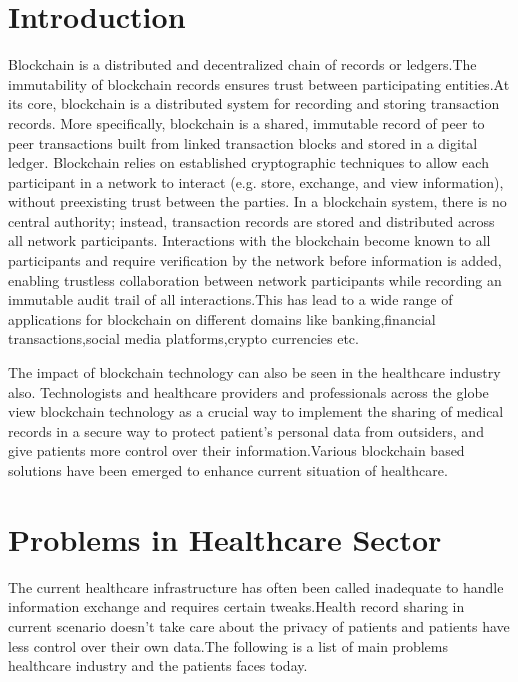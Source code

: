 \documentclass[12pt]{report}
\begin{document}
\tableofcontents
{}

\listoffigures


\chapter{Introduction}

Blockchain is a distributed and decentralized chain of records or ledgers.The immutability of blockchain records ensures trust between participating entities.At its core, blockchain is a distributed
system for recording and storing transaction
records. More specifically, blockchain is a
shared, immutable record of peer to peer
transactions built from linked transaction
blocks and stored in a digital ledger.
Blockchain relies on established
cryptographic techniques to allow each
participant in a network to interact (e.g.
store, exchange, and view information),
without preexisting trust between the
parties. In a blockchain system, there is no
central authority; instead, transaction
records are stored and distributed across all
network participants. Interactions with the
blockchain become known to all participants
and require verification by the network
before information is added, enabling
trustless collaboration between network
participants while recording an immutable
audit trail of all interactions.This has lead to a wide range of applications for blockchain on different domains like banking,financial transactions,social media platforms,crypto currencies etc.
\newline
\par The impact of blockchain technology can also be seen in the healthcare industry also. Technologists and healthcare providers and professionals across the globe view blockchain technology as a crucial way to implement the sharing of medical records in a secure way to protect patient's personal data from outsiders, and give patients more control over their information.Various blockchain based solutions have been emerged to enhance current situation of healthcare.

\chapter{Problems in Healthcare Sector}

The current healthcare infrastructure has often been called inadequate to handle information exchange and requires certain tweaks.Health record sharing in current scenario doesn't take care about the privacy of patients and patients have less control over their own data.The following is a list of main problems healthcare industry and the patients faces today.
\end{document}
